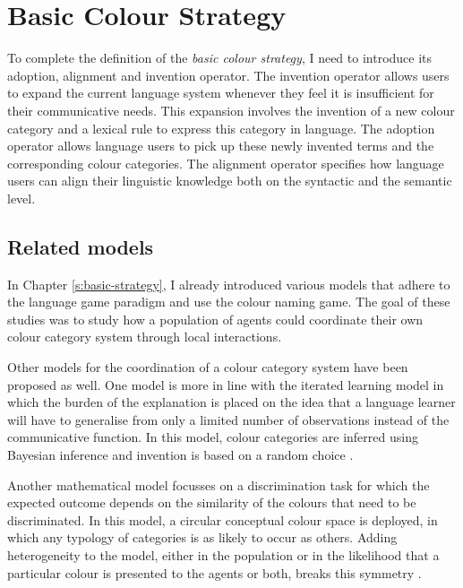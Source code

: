 \chapter{Basic Colour Strategy}
\label{s:basic-operators}

\setcounter{figure}{1}

To complete the definition of the \emph{basic colour strategy}, I need
to introduce its adoption, alignment and invention operator. The
invention operator allows users to expand the current language system
whenever they feel it is insufficient for their communicative
needs. This expansion involves the invention of a new colour category
and a lexical rule to express this category in language. The adoption
operator allows language users to pick up these newly invented terms
and the corresponding colour categories. The alignment operator
specifies how language users can align their linguistic knowledge both
on the syntactic and the semantic level.

\section{Related models}

In Chapter \ref{s:basic-strategy}, I already introduced various models
\citep{steels05coordinating, belpaeme05explaining, belpaeme07language,
  puglisi08cultural, baronchelli10modeling} that adhere to the
language game paradigm and use the colour naming game. The goal of
these studies was to study how a population of agents could coordinate
their own colour category system through local interactions.

Other models for the coordination of a colour category system have
been proposed as well. One model is more in line with the iterated
learning model \citep{smith03iterated} in which the burden of the
explanation is placed on the idea that a language learner will have to
generalise from only a limited number of observations instead of the
communicative function. In this model, colour categories are inferred
using Bayesian inference and invention is based on a random choice
\citep{dowman07explaining}.

Another mathematical model focusses on a discrimination task for which
the expected outcome depends on the similarity of the colours that
need to be discriminated. In this model, a circular conceptual colour
space is deployed, in which any typology of categories is as likely to
occur as others. Adding heterogeneity to the model, either in the
population or in the likelihood that a particular colour is presented
to the agents or both, breaks this symmetry
\citep{komarova08population}.

